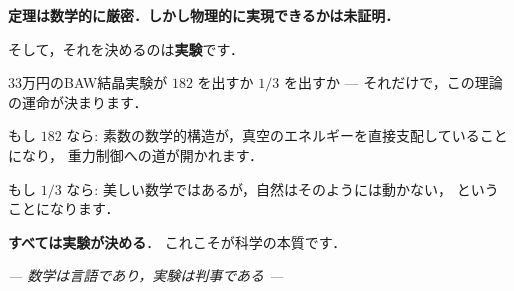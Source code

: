 \documentclass[11pt,a4paper]{article}
\begin{document}
\begin{tcolorbox}[colback=orange!5,colframe=orange!60!black,title=一番大事なこと]
\textbf{定理は数学的に厳密．しかし物理的に実現できるかは未証明．}

そして，それを決めるのは\textbf{実験}です．

33万円のBAW結晶実験が $182$ を出すか $1/3$ を出すか
--- それだけで，この理論の運命が決まります．

もし $182$ なら:
素数の数学的構造が，真空のエネルギーを直接支配していることになり，
重力制御への道が開かれます．

もし $1/3$ なら:
美しい数学ではあるが，自然はそのようには動かない，
ということになります．

\textbf{すべては実験が決める}．
これこそが科学の本質です．
\end{tcolorbox}

\vspace{1em}

\begin{center}
\textit{--- 数学は言語であり，実験は判事である ---}
\end{center}
\end{document}
